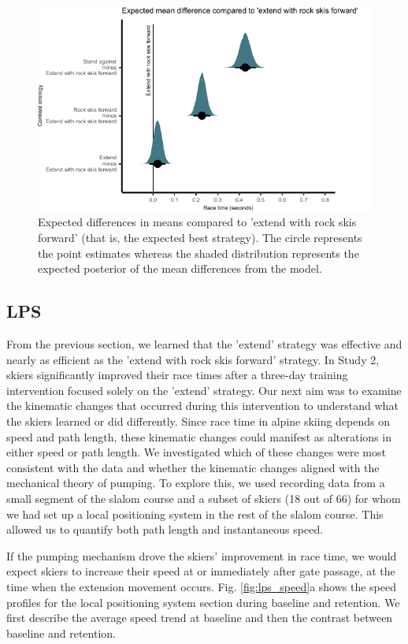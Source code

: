 \begin{figure}[H]
\centering
\includegraphics{figure/figure_results_Q1_strategies_2.pdf}
\caption{Expected differences in means compared to 'extend with rock skis forward' (that is, the expected best strategy). The circle represents the point estimates whereas the shaded distribution represents the expected posterior of the mean differences from the model.}
\label{fig:q1_strategieseffect}
\end{figure}



\subsection{LPS}
From the previous section, we learned that the 'extend' strategy was effective and nearly as efficient as the 'extend with rock skis forward' strategy. In Study 2, skiers significantly improved their race times after a three-day training intervention focused solely on the 'extend' strategy. Our next aim was to examine the kinematic changes that occurred during this intervention to understand what the skiers learned or did differently. Since race time in alpine skiing depends on speed and path length, these kinematic changes could manifest as alterations in either speed or path length. We investigated which of these changes were most consistent with the data and whether the kinematic changes aligned with the mechanical theory of pumping. To explore this, we used recording data from a small segment of the slalom course and a subset of skiers (18 out of 66) for whom we had set up a local positioning system in the rest of the slalom course. This allowed us to quantify both path length and instantaneous speed.

If the pumping mechanism drove the skiers' improvement in race time, we would expect skiers to increase their speed at or immediately after gate passage, at the time when the extension movement occurs. Fig. \ref{fig:lps_speed}a shows the speed profiles for the local positioning system section during baseline and retention. We first describe the average speed trend at baseline and then the contrast between baseline and retention.

